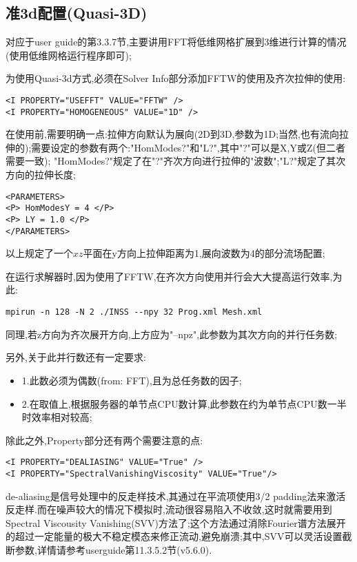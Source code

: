 \subsection{准3d配置(Quasi-3D)} \label{quasi3d}
对应于user guide的第3.3.7节,主要讲用FFT将低维网格扩展到3维进行计算的情况(使用低维网格运行程序即可);\par
为使用Quasi-3d方式,必须在Solver Info部分添加FFTW的使用及齐次拉伸的使用:
\begin{lstlisting}[frame=single]
<I PROPERTY="USEFFT" VALUE="FFTW" />
<I PROPERTY="HOMOGENEOUS" VALUE="1D" />
\end{lstlisting}
\par
在使用前,需要明确一点:拉伸方向默认为展向(2D到3D,参数为1D;当然,也有流向拉伸的);需要设定的参数有两个:"HomModes?"和"L?",其中"?"可以是X,Y或Z(但二者需要一致); "HomModes?"规定了在"?"齐次方向进行拉伸的"波数";"L?"规定了其次方向的拉伸长度;\par
\begin{lstlisting}[frame=single]
<PARAMETERS>
<P> HomModesY = 4 </P>
<P> LY = 1.0 </P>
</PARAMETERS>
\end{lstlisting}
\par
以上规定了一个$xz$平面在y方向上拉伸距离为1,展向波数为4的部分流场配置;\par
在运行求解器时,因为使用了FFTW,在齐次方向使用并行会大大提高运行效率,为此:
\begin{lstlisting}[frame=single]
mpirun -n 128 -N 2 ./INSS --npy 32 Prog.xml Mesh.xml
\end{lstlisting}
\par
同理,若z方向为齐次展开方向,上方应为"--npz",此参数为其次方向的并行任务数;\par
另外,关于此并行数还有一定要求:\par
\begin{itemize}
	\item{1.此数必须为偶数(from: FFT),且为总任务数的因子;}
	\item{2.在取值上,根据服务器的单节点CPU数计算,此参数在约为单节点CPU数一半时效率相对较高;}
\end{itemize}

除此之外,Property部分还有两个需要注意的点:
\begin{lstlisting}[frame=single]
<I PROPERTY="DEALIASING" VALUE="True" />
<I PROPERTY="SpectralVanishingViscosity" VALUE="True"/>
\end{lstlisting}
\par
de-aliasing是信号处理中的反走样技术,其通过在平流项使用3/2 padding法来激活反走样.而在噪声较大的情况下模拟时,流动很容易陷入不收敛,这时就需要用到Spectral Viscousity Vanishing(SVV)方法了;这个方法通过消除Fourier谱方法展开的超过一定能量的极大不稳定模态来修正流动,避免崩溃;其中,SVV可以灵活设置截断参数,详情请参考userguide第11.3.5.2节(v5.6.0).

